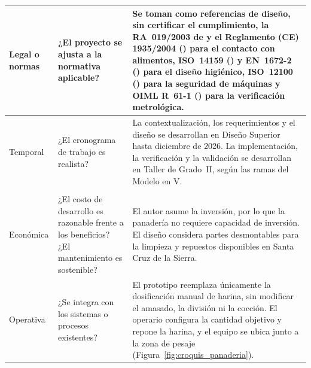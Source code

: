 {\begin{xltabular}{\textwidth}{
    >{\raggedright\arraybackslash}p{0.14\textwidth}
    >{\raggedright\arraybackslash}p{0.26\textwidth}
    >{\raggedright\arraybackslash}X}
    Legal o normas &
    ¿El proyecto se ajusta a la normativa aplicable? &
    Se toman como referencias de diseño, sin certificar el cumplimiento, la
    RA~019/2003 de \textcite{senasag2003ra019} y el Reglamento (CE)
    1935/2004 (\citeyear{ue2004reg1935}) para el contacto con alimentos,
    ISO~14159 (\citeyear{iso2002iso14159}) y EN~1672-2
    (\citeyear{cen2020en1672}) para el diseño higiénico, ISO~12100
    (\citeyear{iso2010iso12100}) para la seguridad de máquinas y OIML R~61-1
    (\citeyear{oiml2017r61}) para la verificación metrológica. \\
    \midrule

    Temporal &
    ¿El cronograma de trabajo es realista? &
    La contextualización, los requerimientos y el diseño se desarrollan en
    Diseño Superior hasta diciembre de 2026. La implementación, la
    verificación y la validación se desarrollan en Taller de Grado~II, según
    las ramas del Modelo en V. \\
    \midrule[1pt]

     \\
    \midrule

    Económica &
    ¿El costo de desarrollo es razonable frente a los beneficios?
    ¿El mantenimiento es sostenible? &
    El autor asume la inversión, por lo que la panadería no requiere
    capacidad de inversión. El diseño considera partes desmontables para la
    limpieza y repuestos disponibles en Santa Cruz de la Sierra. \\
    \midrule

    Operativa &
    ¿Se integra con los sistemas o procesos existentes? &
    El prototipo reemplaza únicamente la dosificación manual de harina, sin
    modificar el amasado, la división ni la cocción. El operario configura la
    cantidad objetivo y repone la harina, y el equipo se ubica junto a la
    zona de pesaje (Figura~\ref{fig:croquis_panaderia}). \\
    \midrule


\end{xltabular}}
